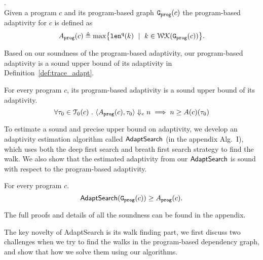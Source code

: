  \begin{defn}
 .
 \label{def:prog_adapt}
 \\
 {
 Given a program ${c}$ and its program-based graph 
 $\mathtt{{G_{prog}}}({c})$
 the program-based adaptivity for $c$ is 
 defined as%
 \[
 \progA({c})
 \triangleq \max
 \left\{ \qlen(k) \ \mid \  k\in \walks(\progG({c}))\right \}.
 \]
 }
 \end{defn}
 Based on our soundness of the program-based adaptivity, our program-based adaptivity is a sound upper bound of its adaptivity in Definition~\ref{def:trace_adapt}. 
 \begin{thm}
     \label{thm:sound_progadapt}
     For every program $c$, 
     its program-based adaptivity is a sound upper bound of its adaptivity.
      $$ \forall \mathtt{\tau}_0 \in \mathcal{T}_{0}(c) ~.~ 
 \langle A_{\mathtt{prog}}(c), \mathtt{\tau}_0 \rangle \Downarrow_e n \implies n \geq A(c)(\mathtt{\tau}_0) $$
 \end{thm}
 To estimate a sound and precise upper bound on adaptivity, we develop an adaptivity estimation algorithm called $\mathsf{AdaptSearch}$ (in the appendix Alg.~I), which uses both the deep first search and breath first search strategy to find the walk. We also show that the estimated adaptivity from our $\mathsf{AdaptSearch}$ is sound with respect to the program-based adaptivity. 
 \begin{thm}
     \label{thm:sound_adaptalg}
     For every program $c$.
      $$\mathsf{AdaptSearch}(\mathtt{{G_{prog}}}({c})) \geq A_{\mathtt{prog}}(c).$$
 \end{thm}
 The full proofs and details of all the soundness can be found in the appendix.
 
  The key novelty of AdaptSearch is its walk finding part, we first discuss two challenges when we try to find the walks in the program-based dependency graph, and show that how we solve them using our algorithms.
 
